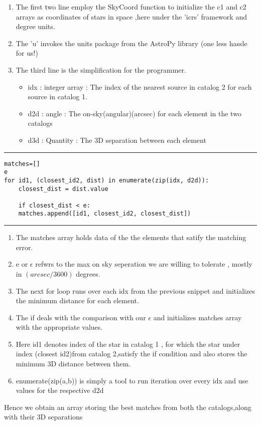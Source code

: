 \documentclass{article}
\begin{document}
\begin{enumerate}
    \color{red}
    \item The first two line employ the SkyCoord function to initialize the c1 and c2 arrays as coordinates of stars in space ,here under the 'icrs' framework and degree units.
    \item The 'u' invokes the units package from the AstroPy library (one less hassle for us!)
    \item The third line is the simplification for the programmer.
        \begin{itemize}
            \item idx : integer array : The index of the nearest source in catalog 2 for each source in catalog 1.
            \item d2d : angle : The on-sky(angular)(arcsec) for each element in the two catalogs
            \item d3d : Quantity : The 3D separation between each element  
        \end{itemize}
\end{enumerate}
\medskip
\hrule
\medskip
\begin{lstlisting}
matches=[]
e         
for id1, (closest_id2, dist) in enumerate(zip(idx, d2d)):
    closest_dist = dist.value
      
    if closest_dist < e: 
    matches.append([id1, closest_id2, closest_dist])
\end{lstlisting}
\medskip
\hrule
\medskip
\begin{enumerate}
    \color{red}
    \item The matches array holds data of the the elements that satify the matching error.
    \item e or \(\epsilon\) refwrs to the max on sky seperation we are willing to tolerate , mostly in \((arcsec/3600)\) degrees.
    \item The next for loop runs over each idx from the previous snippet and initializes the minimum distance for each element.
    \item The if deals with the comparison with our \(\epsilon\) and initializes matches array with the appropriate values.
    \item Here id1 denotes index of the star in catalog 1 , for which the star under index (closest id2)from catalog 2,satisfy the if condition and also stores the minimum 3D distance between them.
    \item enumerate(zip(a,b)) is simply a tool to run iteration over every idx and use values for the respective d2d
\end{enumerate}
Hence we obtain an array storing the best matches from both the catalogs,along with their 3D separations 
\end{document}
